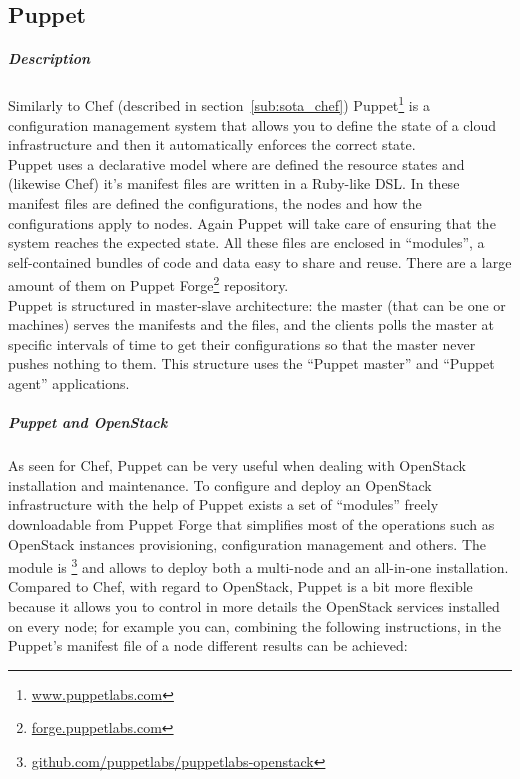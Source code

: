 

\subsection{Puppet}
\label{sub:sota_puppet}

\subparagraph{Description}
\label{subp:sota_puppet_desc}

Similarly to Chef (described in section~\ref{sub:sota_chef}) Puppet\footnote{\url{www.puppetlabs.com}} is a configuration management system that allows you to define the state of a cloud infrastructure and then it automatically enforces the correct state.\\
Puppet uses a declarative model where are defined the resource states and (likewise Chef) it's manifest files are written in a Ruby-like DSL. In these manifest files are defined the configurations, the nodes and how the configurations apply to nodes. Again Puppet will take care of ensuring that the system reaches the expected state. All these files are enclosed in ``modules'', a self-contained bundles of code and data easy to share and reuse. There are a large amount of them on Puppet Forge\footnote{\url{forge.puppetlabs.com}} repository.\\
Puppet is structured in master-slave architecture: the master (that can be one or machines) serves the manifests and the files, and the clients polls the master at specific intervals of time to get their configurations so that the master never pushes nothing to them. This structure uses the ``Puppet master'' and ``Puppet agent'' applications.


\subparagraph{Puppet and OpenStack}
\label{subp:sota_puppet_openstack}

As seen for Chef, Puppet can be very useful when dealing with OpenStack installation and maintenance. To configure and deploy an OpenStack infrastructure with the help of Puppet exists a set of ``modules'' freely downloadable from Puppet Forge that simplifies most of the operations such as OpenStack instances provisioning, configuration management and others.
The module is \footnote{\url{github.com/puppetlabs/puppetlabs-openstack}} and allows to deploy both a multi-node and an all-in-one installation. Compared to Chef, with regard to OpenStack, Puppet is a bit more flexible because it allows you to control in more details the OpenStack services installed on every node; for example you can, combining the following instructions, in the Puppet's manifest file of a node different results can be achieved:

